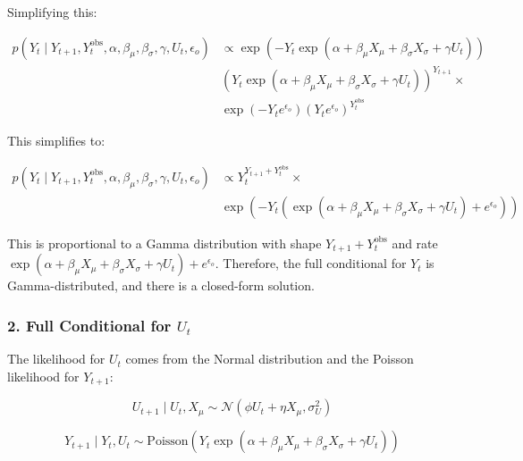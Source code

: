 \documentclass[
  letterpaper,
  DIV=11,
  numbers=noendperiod]{scrartcl}
\begin{document}
Simplifying this:

\begin{equation}
\begin{split}
p(Y_t \mid Y_{t+1}, Y_t^{\text{obs}}, \alpha, \beta_{\mu}, \beta_{\sigma}, \gamma, U_t, \epsilon_o) & \propto \exp\left(-Y_t \exp(\alpha + \beta_{\mu} X_{\mu} + \beta_{\sigma} X_{\sigma} + \gamma U_t)\right) \\
& \left(Y_t \exp(\alpha + \beta_{\mu} X_{\mu} + \beta_{\sigma} X_{\sigma} + \gamma U_t)\right)^{Y_{t+1}} \times \\ 
& \exp\left(-Y_t e^{\epsilon_o}\right) \left(Y_t e^{\epsilon_o}\right)^{Y_t^{\text{obs}}}
\end{split}
\end{equation}

This simplifies to:

\begin{equation}
\begin{split}
p(Y_t \mid Y_{t+1}, Y_t^{\text{obs}}, \alpha, \beta_{\mu}, \beta_{\sigma}, \gamma, U_t, \epsilon_o)  & \propto Y_t^{Y_{t+1} + Y_t^{\text{obs}}} \times \\
& \exp\left( -Y_t \left( \exp(\alpha + \beta_{\mu} X_{\mu} + \beta_{\sigma} X_{\sigma} + \gamma U_t) + e^{\epsilon_o} \right) \right)
\end{split}
\end{equation}

This is proportional to a Gamma distribution with shape
\(Y_{t+1} + Y_t^{\text{obs}}\) and rate
\(\exp(\alpha + \beta_{\mu} X_{\mu} + \beta_{\sigma} X_{\sigma} + \gamma U_t) + e^{\epsilon_o}\).
Therefore, the full conditional for \(Y_t\) is Gamma-distributed, and
there is a closed-form solution.

\subsubsection{\texorpdfstring{2. Full Conditional for
\(U_t\)}{2. Full Conditional for U\_t}}\label{full-conditional-for-u_t}

The likelihood for \(U_t\) comes from the Normal distribution and the
Poisson likelihood for \(Y_{t+1}\):

\begin{equation}
U_{t+1} \mid U_t, X_{\mu} \sim \mathcal{N}(\phi U_t + \eta X_{\mu}, \sigma_U^2)
\end{equation}

\begin{equation}
Y_{t+1} \mid Y_t, U_t \sim \text{Poisson}(Y_t \exp(\alpha + \beta_{\mu} X_{\mu} + \beta_{\sigma} X_{\sigma} + \gamma U_t))
\end{equation}
\end{document}
